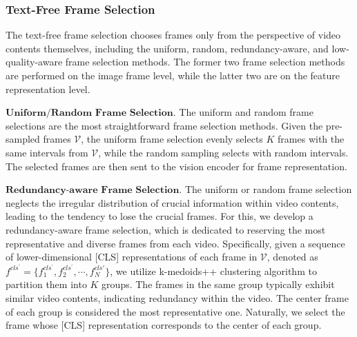 \documentclass[11pt]{article}
\begin{document}
\subsubsection{Text-Free Frame Selection}

The text-free frame selection chooses frames only from the perspective of video contents themselves, including the uniform, random, redundancy-aware, and low-quality-aware frame selection methods.
The former two frame selection methods are performed on the image frame level, while the latter two are on the feature representation level.

$\textbf{Uniform/Random Frame Selection.}$ 
The uniform and random frame selections are the most straightforward frame selection methods.
Given the pre-sampled frames $\mathcal{V}$, the uniform frame selection evenly selects $K$ frames with the same intervals from $\mathcal{V}$, while the random sampling selects with random intervals.
The selected frames are then sent to the vision encoder for frame representation.

$\textbf{Redundancy-aware Frame Selection.}$
The uniform or random frame selection neglects the irregular distribution of crucial information within video contents, leading to the tendency to lose the crucial frames.
For this, we develop a redundancy-aware frame selection, which is dedicated to reserving the most representative and diverse frames from each video.
Specifically, given a sequence of lower-dimensional [CLS] representations of each frame in $\mathcal{V}$, denoted as $f^{cls^\prime}=\{f_1^{cls^\prime}, f_2^{cls^\prime}, \cdots, f_N^{cls\prime}\}$, we utilize k-medoids++ clustering algorithm \cite{zhao2022centerclip} to partition them into $K$ groups.
The frames in the same group typically exhibit similar video contents, indicating redundancy within the video.
The center frame of each group is considered the most representative one.
Naturally, we select the frame whose [CLS] representation corresponds to the center of each group.
\end{document}
